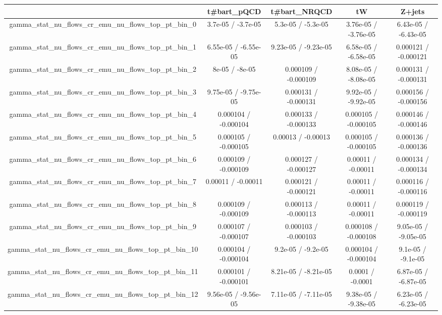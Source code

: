\documentclass[10pt]{article}
\begin{document}
\begin{table}[htbp]
\begin{center}
\begin{tabular}{|c|c|c|c|c|}
\hline 
      & t#bar{t}_{pQCD}      & t#bar{t}_{NRQCD}      & tW      & Z+jets \\ 
\hline 
  gamma_stat_nu_flows_cr_emu_nu_flows_top_pt_bin_0 & 3.7e-05 / -3.7e-05 & 5.3e-05 / -5.3e-05 & 3.76e-05 / -3.76e-05 & 6.43e-05 / -6.43e-05 \\ 
  gamma_stat_nu_flows_cr_emu_nu_flows_top_pt_bin_1 & 6.55e-05 / -6.55e-05 & 9.23e-05 / -9.23e-05 & 6.58e-05 / -6.58e-05 & 0.000121 / -0.000121 \\ 
  gamma_stat_nu_flows_cr_emu_nu_flows_top_pt_bin_2 & 8e-05 / -8e-05 & 0.000109 / -0.000109 & 8.08e-05 / -8.08e-05 & 0.000131 / -0.000131 \\ 
  gamma_stat_nu_flows_cr_emu_nu_flows_top_pt_bin_3 & 9.75e-05 / -9.75e-05 & 0.000131 / -0.000131 & 9.92e-05 / -9.92e-05 & 0.000156 / -0.000156 \\ 
  gamma_stat_nu_flows_cr_emu_nu_flows_top_pt_bin_4 & 0.000104 / -0.000104 & 0.000133 / -0.000133 & 0.000105 / -0.000105 & 0.000146 / -0.000146 \\ 
  gamma_stat_nu_flows_cr_emu_nu_flows_top_pt_bin_5 & 0.000105 / -0.000105 & 0.00013 / -0.00013 & 0.000105 / -0.000105 & 0.000136 / -0.000136 \\ 
  gamma_stat_nu_flows_cr_emu_nu_flows_top_pt_bin_6 & 0.000109 / -0.000109 & 0.000127 / -0.000127 & 0.00011 / -0.00011 & 0.000134 / -0.000134 \\ 
  gamma_stat_nu_flows_cr_emu_nu_flows_top_pt_bin_7 & 0.00011 / -0.00011 & 0.000121 / -0.000121 & 0.00011 / -0.00011 & 0.000116 / -0.000116 \\ 
  gamma_stat_nu_flows_cr_emu_nu_flows_top_pt_bin_8 & 0.000109 / -0.000109 & 0.000113 / -0.000113 & 0.00011 / -0.00011 & 0.000119 / -0.000119 \\ 
  gamma_stat_nu_flows_cr_emu_nu_flows_top_pt_bin_9 & 0.000107 / -0.000107 & 0.000103 / -0.000103 & 0.000108 / -0.000108 & 9.05e-05 / -9.05e-05 \\ 
  gamma_stat_nu_flows_cr_emu_nu_flows_top_pt_bin_10 & 0.000104 / -0.000104 & 9.2e-05 / -9.2e-05 & 0.000104 / -0.000104 & 9.1e-05 / -9.1e-05 \\ 
  gamma_stat_nu_flows_cr_emu_nu_flows_top_pt_bin_11 & 0.000101 / -0.000101 & 8.21e-05 / -8.21e-05 & 0.0001 / -0.0001 & 6.87e-05 / -6.87e-05 \\ 
  gamma_stat_nu_flows_cr_emu_nu_flows_top_pt_bin_12 & 9.56e-05 / -9.56e-05 & 7.11e-05 / -7.11e-05 & 9.38e-05 / -9.38e-05 & 6.23e-05 / -6.23e-05 \\ 

\end{tabular}
\end{center}
\end{table}
\end{document}
